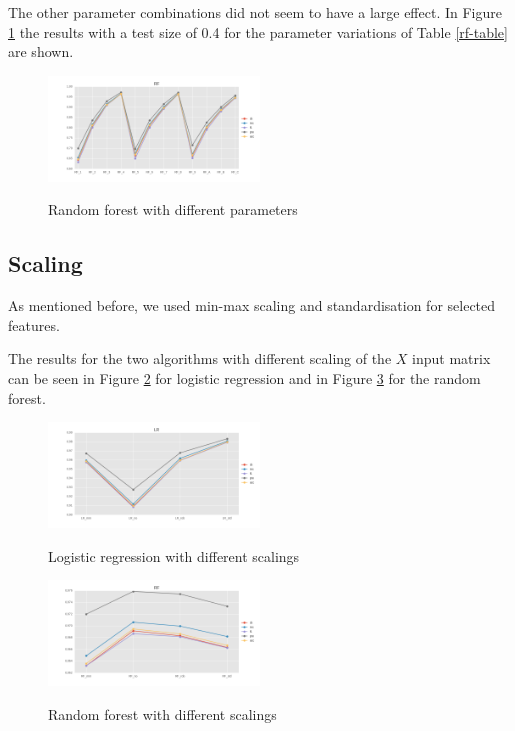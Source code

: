 \documentclass{sig-alternate-05-2015}
\begin{document}
The other parameter combinations did not seem to have a large effect.
In Figure \ref{fig:rf} the results with a test size of 0.4 for the parameter variations of Table \ref{rf-table} are shown.

\begin{figure}[h]
  \centering
  \caption{Random forest with different parameters}
  \includegraphics[width=0.5\textwidth]{../plots/RF_compare_param}
  \label{fig:rf}
\end{figure}

\subsection{Scaling}

As mentioned before, we used min-max scaling and standardisation for selected features.

The results for the two algorithms with different scaling of the $X$ input matrix can be seen in Figure \ref{fig:lr_scaling} for logistic regression and in Figure \ref{fig:rf_scaling} for the random forest.

\begin{figure}[h]
  \centering
  \caption{Logistic regression with different scalings}
  \includegraphics[width=0.5\textwidth]{../plots/LR_compare_scaling}
  \label{fig:lr_scaling}
\end{figure}
\begin{figure}[h]
  \centering
  \caption{Random forest with different scalings}
  \includegraphics[width=0.5\textwidth]{../plots/RF_compare_scaling}
  \label{fig:rf_scaling}
\end{figure}
\end{document}
